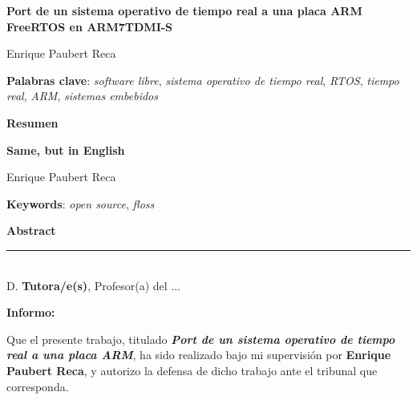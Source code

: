 \thispagestyle{empty}

\begin{center}
{\large\bfseries Port de un sistema operativo de tiempo real a una placa ARM \\ FreeRTOS en ARM7TDMI-S }\\
\end{center}
\begin{center}
Enrique Paubert Reca\\
\end{center}


\vspace{0.5cm}
\noindent\textbf{Palabras clave}: \textit{software libre}, \textit{sistema operativo de tiempo real}, \textit{RTOS}, \textit{tiempo real}, \textit{ARM}, \textit{sistemas embebidos}
\vspace{0.7cm}

\noindent\textbf{Resumen}\\
	

\cleardoublepage

\begin{center}
	{\large\bfseries Same, but in English}\\
\end{center}
\begin{center}
	Enrique Paubert Reca\\
\end{center}
\vspace{0.5cm}
\noindent\textbf{Keywords}: \textit{open source}, \textit{floss}
\vspace{0.7cm}

\noindent\textbf{Abstract}\\


\cleardoublepage

\thispagestyle{empty}

\noindent\rule[-1ex]{\textwidth}{2pt}\\[4.5ex]

D. \textbf{Tutora/e(s)}, Profesor(a) del ...

\vspace{0.5cm}

\textbf{Informo:}

\vspace{0.5cm}

Que el presente trabajo, titulado \textit{\textbf{Port de un sistema operativo de tiempo real a una placa ARM}},
ha sido realizado bajo mi supervisión por \textbf{Enrique Paubert Reca}, y autorizo la defensa de dicho trabajo ante el tribunal
que corresponda.


